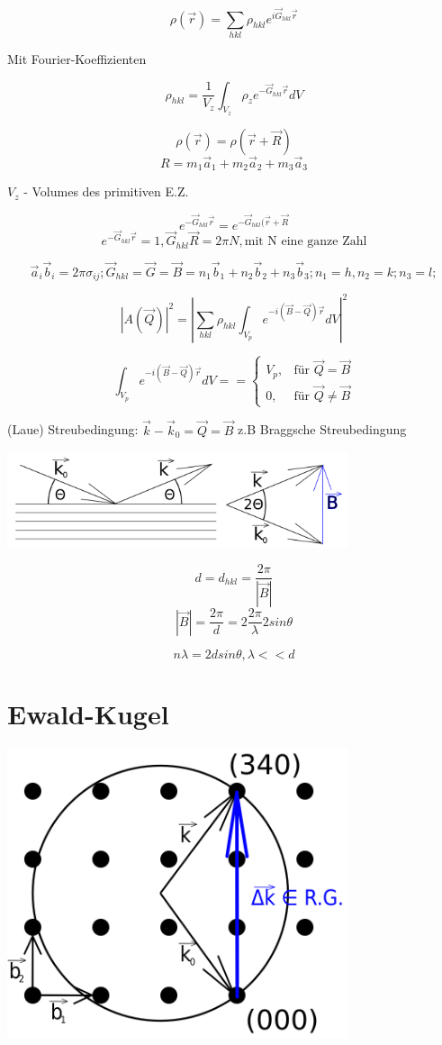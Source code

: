 \[ \rho (\vec r) = \sum_{hkl} \rho_{hkl}e^{i\vec G_{hkl}\vec r} \]

Mit Fourier-Koeffizienten

\[ \rho_{hkl} = \frac 1 {V_z}\int_{V_z}\rho_z e^{-\vec G_{hkl}\vec
  r}dV \]

\[ \rho(\vec r) = \rho (\vec r+\vec R)\]
\[ R=m_1\vec a_1+m_2\vec a_2+m_3\vec a_3\]

\(V_z\) - Volumes des primitiven E.Z.

\[ e^{-\vec G_{hkl}\vec r}=  e^{-\vec G_{hkl}(\vec r+\vec R} \]
\[ e^{-\vec G_{hkl}\vec r}=1, \vec G_{hkl}\vec R= 2\pi N, \text{mit N
  eine ganze Zahl} \]

\[\vec a_i \vec b_i = 2\pi \sigma_{ij};  \vec G_{hkl} = \vec G = \vec
B = n_1 \vec b_1 +  n_2 \vec b_2 + n_3 \vec b_3; n_1=h, n_2=k; n_3=l; \]

\[  | A(\vec Q)|^2= |\sum_{hkl}\rho_{hkl}\int_{V_p} e^{-i(\vec B-\vec
  Q)\vec r} dV|^2 \]

\[ 
\int_{V_p} e^{-i(\vec B-\vec Q)\vec r} dV = =\begin{cases}
  V_p,  & \text{für } \vec Q=\vec B \\
  0, & \text{für } \vec Q\neq\vec B
\end{cases}
\]

(Laue) Streubedingung: \(\vec k - \vec k_0 = \vec Q= \vec B \)
z.B Braggsche Streubedingung

 
\includegraphics[width=0.75\textwidth]{kap03_03.png}

\[ d = d_{hkl} = \frac {2\pi}{|\vec B|}\]
\[|\vec B| =  \frac {2\pi}{d} =2
\frac {2\pi}{\lambda}2sin\theta \]

\[ n\lambda = 2dsin\theta, \lambda << d\]

\section{Ewald-Kugel}

\includegraphics[width=0.75\textwidth]{kap03_04.png}


